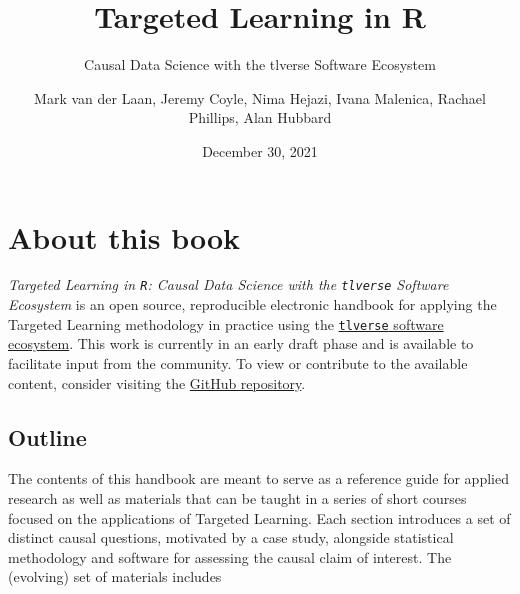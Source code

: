 \documentclass[
  12pt, krantz2,
]{krantz}
\title{Targeted Learning in R}
\subtitle{Causal Data Science with the tlverse Software Ecosystem}
\author{Mark van der Laan, Jeremy Coyle, Nima Hejazi, Ivana Malenica, Rachael Phillips, Alan Hubbard}
\date{December 30, 2021}
\newcommand{\passthrough}[1]{#1}
\newcommand{\1}{\mathbbm{1}}
\theoremstyle{definition}
\theoremstyle{definition}
\theoremstyle{definition}
\theoremstyle{definition}
\theoremstyle{remark}
\begin{document}
\maketitle


\thispagestyle{empty}

\begin{center}
\end{center}

\setlength{\abovedisplayskip}{-5pt}
\setlength{\abovedisplayshortskip}{-5pt}

\mainmatter

{
\hypersetup{linkcolor=}
\setcounter{tocdepth}{2}
\tableofcontents
}
\listoftables
\listoffigures
\hypertarget{about-this-book}{%
\chapter*{About this book}\label{about-this-book}}


\emph{Targeted Learning in \passthrough{\lstinline!R!}: Causal Data Science with the \passthrough{\lstinline!tlverse!} Software
Ecosystem} is an open source, reproducible electronic handbook for applying the
Targeted Learning methodology in practice using the \href{https://github.com/tlverse}{\passthrough{\lstinline!tlverse!} software
ecosystem}. This work is currently in an early draft
phase and is available to facilitate input from the community. To view or
contribute to the available content, consider visiting the \href{https://github.com/tlverse/tlverse-handbook}{GitHub
repository}.

\hypertarget{outline}{%
\section{Outline}\label{outline}}

The contents of this handbook are meant to serve as a reference guide for
applied research as well as materials that can be taught in a series of short
courses focused on the applications of Targeted Learning. Each section
introduces a set of distinct causal questions, motivated by a case study,
alongside statistical methodology and software for assessing the causal claim of
interest. The (evolving) set of materials includes
\end{document}
